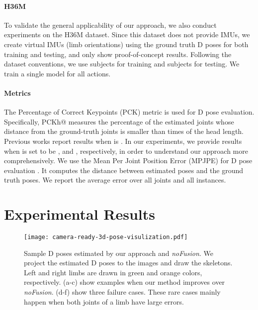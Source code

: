 \documentclass[10pt,twocolumn,letterpaper]{article}
\begin{document}
\paragraph{H36M \cite{ionescu2014human3}}
To validate the general applicability of our approach, we also conduct experiments on the H36M dataset. Since this dataset does not provide IMUs, we create virtual IMUs (limb orientations) using the ground truth D poses for both training and testing, and only show proof-of-concept results. Following the dataset conventions, we use subjects  for training and subjects  for testing. We train a single model for all actions.


\paragraph{Metrics} 
The Percentage of Correct Keypoints (PCK) metric is used for D pose evaluation. Specifically, PCKh@ measures the percentage of the estimated joints whose distance from the ground-truth joints is smaller than  times of the head length. Previous works report results when  is . In our experiments, we provide results when  is set to be ,  and , respectively, in order to understand our approach more comprehensively. We use the Mean Per Joint Position Error (MPJPE) for D pose evaluation \cite{ionescu2014human3}. It computes the distance between estimated poses and the ground truth poses. We report the average error over all joints and all instances.








\section{Experimental Results}
\begin{figure*}[]
\centering
\texttt{[image: camera-ready-3d-pose-visulization.pdf]}
\caption{Sample D poses estimated by our approach and \emph{noFusion}. We project the estimated D poses to the images and draw the skeletons.
Left and right limbs are drawn in green and orange colors, respectively. (a-c) show examples when our method improves over \emph{noFusion}. 
(d-f) show three failure cases.
These rare cases mainly happen when both joints of a limb have large errors.}
\label{fig:visual}
\end{figure*}
\end{document}
